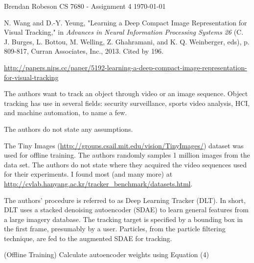 \documentclass[11pt]{article}
\begin{document}
\noindent Brendan Robeson \hfill CS 7680 - Assignment 4 \hfill \today
%
%

\medskip

\begin{description}[leftmargin=0in]
    \item [Source] N. Wang and D.-Y. Yeung, "Learning a Deep Compact Image
        Representation for Visual Tracking," in \emph{Advances in Neural
        Information Processing Systems 26} (C. J. Burges, L. Bottou, M. Welling,
        Z. Ghahramani, and K. Q. Weinberger, eds), p. 809-817, Curran
        Associates, Inc., 2013. Cited by 196.

    \item [URL]
        {\smaller\url{http://papers.nips.cc/paper/5192-learning-a-deep-compact-image-representation-for-visual-tracking}}

    \item [Problem] The authors want to track an object through video or an
        image sequence. Object tracking has use in several fields: security
        surveillance, sports video analysis, HCI, and machine automation, to
        name a few.

    \item [Assumptions] The authors do not state any assumptions.

    \item [Data Sets] The Tiny Images
        (\url{http://groups.csail.mit.edu/vision/TinyImages/}) dataset was used for
        offline training. The authors randomly samples 1 million images from the
        data set. The authors do not state where they acquired the video
        sequences used for their experiments. I found most (and many more) at
        \url{http://cvlab.hanyang.ac.kr/tracker_benchmark/datasets.html}.

    \item [Algorithm Overview] The authors' procedure is referred to as Deep
        Learning Tracker (DLT). In short, DLT uses a stacked denoising
        autoencoder (SDAE) to learn general features from a large imagery
        database. The tracking target is specified by a bounding box in the
        first frame, presumably by a user. Particles, from the particle
        filtering technique, are fed to the augmented SDAE for tracking.

        \begin{algorithm}
            \Begin(Offline Training)
            {
                {
                    Calculate autoencoder weights using Equation (4)\;
                }
            }
        \end{algorithm}


\end{description}
\end{document}
